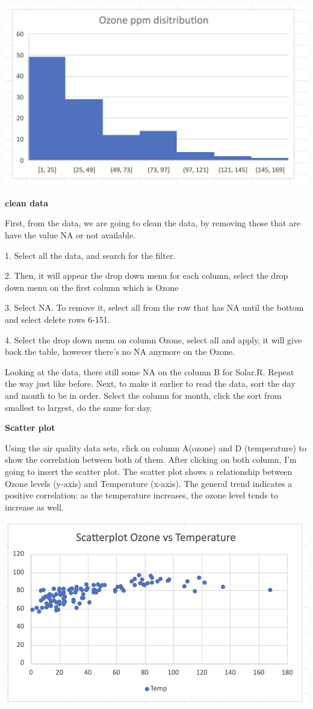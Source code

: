 \documentclass[
  letterpaper,
  DIV=11,
  numbers=noendperiod]{scrreprt}
\begin{document}
\includegraphics{./histogramozone.png}

\textbf{clean data}

First, from the data, we are going to clean the data, by removing those
that are have the value NA or not available.

1. Select all the data, and search for the filter.

2. Then, it will appear the drop down menu for each column, select the
drop down menu on the first column which is Ozone

3. Select NA. To remove it, select all from the row that has NA until
the bottom and select delete rows 6-151.

4. Select the drop down menu on column Ozone, select all and apply, it
will give back the table, however there's no NA anymore on the Ozone.

Looking at the data, there still some NA on the column B for Solar.R.
Repeat the way just like before. Next, to make it earlier to read the
data, sort the day and month to be in order. Select the column for
month, click the sort from smallest to largest, do the same for day.

\textbf{Scatter plot}

Using the air quality data sets, click on column A(ozone) and D
(temperature) to show the correlation between both of them. After
clicking on both column, I'm going to insert the scatter plot. The
scatter plot shows a relationship between Ozone levels (y-axis) and
Temperature (x-axis). The general trend indicates a positive
correlation: as the temperature increases, the ozone level tends to
increase as well.

\includegraphics{./scatterplotozone.png}
\end{document}
